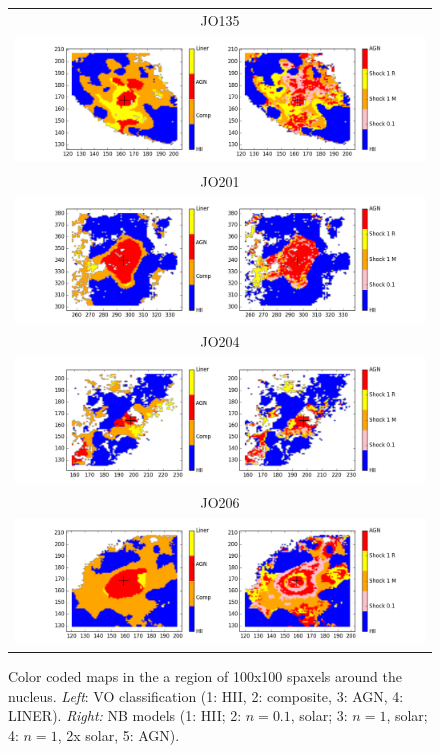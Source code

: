 \documentclass[fleqn,usenatbib]{mnras}
\begin{document}
\begin{figure}
	\begin{tabular}{c}
		JO135 \\
		\includegraphics[width=.95\linewidth]{Plots/JO135_NB_xbest_grid.png}\\
		JO201\\
		\includegraphics[width=.95\linewidth]{Plots/JO201_NB_xbest_grid.png}\\
		JO204\\
		\includegraphics[width=.95\linewidth]{Plots/JO204_NB_xbest_grid.png}\\
		JO206 \\
		\includegraphics[width=.95\linewidth]{Plots/JO206_NB_xbest_grid.png}\\
	\end{tabular} 
	\caption{Color coded maps in the a region of 100x100 spaxels around the nucleus. {\em Left}: VO classification (1: HII, 2: composite, 3: AGN, 4: LINER). {\em Right:} NB models (1: HII; 2: $n=0.1$, solar; 3: $n=1$, solar; 4: $n=1$, 2x solar, 5: AGN). \label{fig:mapsKV2NB}}
\end{figure}
\end{document}
